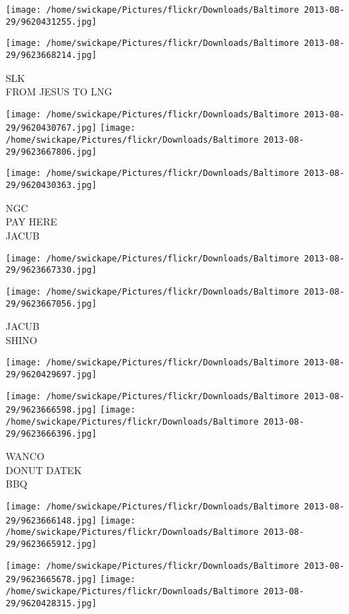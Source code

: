 \documentclass[10pt,letterpaper]{article}
\begin{document}
\texttt{[image: /home/swickape/Pictures/flickr/Downloads/Baltimore 2013-08-29/9620431255.jpg]}

\vspace{0.25in}
\texttt{[image: /home/swickape/Pictures/flickr/Downloads/Baltimore 2013-08-29/9623668214.jpg]}

SLK\\
FROM JESUS TO LNG
\pagebreak

\texttt{[image: /home/swickape/Pictures/flickr/Downloads/Baltimore 2013-08-29/9620430767.jpg]}
\texttt{[image: /home/swickape/Pictures/flickr/Downloads/Baltimore 2013-08-29/9623667806.jpg]}

\vspace{0.25in}
\texttt{[image: /home/swickape/Pictures/flickr/Downloads/Baltimore 2013-08-29/9620430363.jpg]}

NGC\\
PAY HERE\\
JACUB
\pagebreak

\texttt{[image: /home/swickape/Pictures/flickr/Downloads/Baltimore 2013-08-29/9623667330.jpg]}

\vspace{0.25in}
\texttt{[image: /home/swickape/Pictures/flickr/Downloads/Baltimore 2013-08-29/9623667056.jpg]}

JACUB\\
SHINO
\pagebreak

\texttt{[image: /home/swickape/Pictures/flickr/Downloads/Baltimore 2013-08-29/9620429697.jpg]}

\vspace{0.25in}
\texttt{[image: /home/swickape/Pictures/flickr/Downloads/Baltimore 2013-08-29/9623666598.jpg]}
\texttt{[image: /home/swickape/Pictures/flickr/Downloads/Baltimore 2013-08-29/9623666396.jpg]}

WANCO\\
DONUT DATEK\\
BBQ
\pagebreak

\texttt{[image: /home/swickape/Pictures/flickr/Downloads/Baltimore 2013-08-29/9623666148.jpg]}
\texttt{[image: /home/swickape/Pictures/flickr/Downloads/Baltimore 2013-08-29/9623665912.jpg]}

\texttt{[image: /home/swickape/Pictures/flickr/Downloads/Baltimore 2013-08-29/9623665678.jpg]}
\texttt{[image: /home/swickape/Pictures/flickr/Downloads/Baltimore 2013-08-29/9620428315.jpg]}
\end{document}

